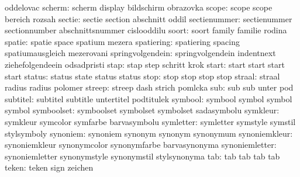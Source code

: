                        oddelovac
              scherm:  scherm               display              bildschirm
                       obrazovka
               scope:  scope                scope                bereich
                       rozsah
              sectie:  sectie               section              abschnitt
                       oddil
        sectienummer:  sectienummer         sectionnumber        abschnittsnummer
                       cislooddilu
               soort:  soort                family               familie
                       rodina
              spatie:  spatie               space                spatium
                       mezera
          spatiering:  spatiering           spacing              spatiumausgleich
                       mezerovani
    springvolgendein:  springvolgendein     indentnext           ziehefolgendeein
                       odsadpristi
                stap:  stap                 step                 schritt
                       krok
               start:  start                start                start
                       start
              status:  status               state                status
                       status
                stop:  stop                 stop                 stop
                       stop
              straal:  straal               radius               radius
                       polomer
              streep:  streep               dash                 strich
                       pomlcka
                 sub:  sub                  sub                  unter
                       pod
            subtitel:  subtitel             subtitle             untertitel
                       podtitulek
             symbool:  symbool              symbol               symbol
                       symbol
          symboolset:  symboolset           symbolset            symbolset
                       sadasymbolu
            symkleur:  symkleur             symcolor             symfarbe
                       barvasymbolu
           symletter:  symletter            symstyle             symstil
                       stylsymboly
            synoniem:  synoniem             synonym              synonym
                       synonymum
       synoniemkleur:  synoniemkleur        synonymcolor         synonymfarbe
                       barvasynonyma
      synoniemletter:  synoniemletter       synonymstyle         synonymstil        stylsynonyma
                 tab:  tab                  tab                  tab
                       tab
               teken:  teken                sign                 zeichen
